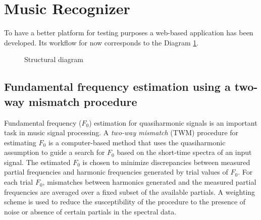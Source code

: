 \section{Music Recognizer}

To have a better platform for testing purposes a web-based application
has been developed. Its workflow for now corresponds to the Diagram \ref{F:6-sd}.

\begin{figure}[b]
  \centering
  \caption{Structural diagram}
    \label{F:6-sd}
\end{figure}

\subsection{Fundamental frequency estimation using a two-way mismatch procedure}

Fundamental frequency ($F_0$) estimation for quasiharmonic signals
is an important task in music signal processing.
A \textit{two-way mismatch} (TWM) procedure for estimating $F_0$
is a computer-based method that uses the quasiharmonic assumption
to guide a search for $F_0$ based on the short-time spectra of an input signal.
The estimated $F_0$ is chosen to minimize discrepancies between measured
partial frequencies and harmonic frequencies generated by trial
values of $F_0$. For each trial $F_0$, mismatches between harmonics
generated and the measured partial frequencies are averaged over a fixed subset
of the available partials. A weighting scheme is used to reduce the
susceptibility of the procedure to the presence of noise or absence
of certain partials in the spectral data.

